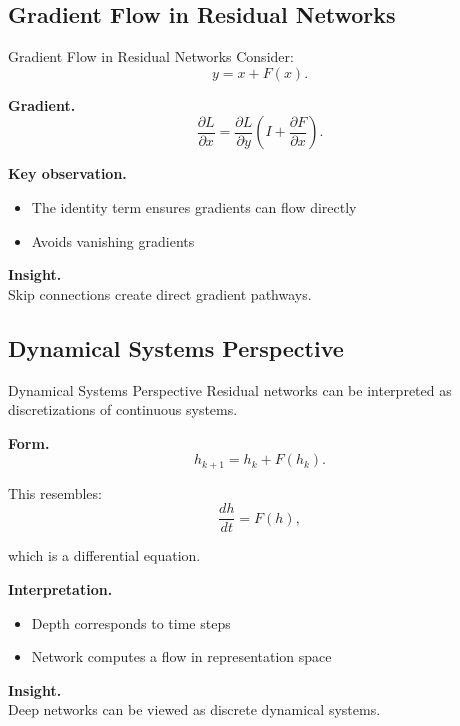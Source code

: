 \documentclass[aspectratio=169,11pt]{beamer}
\begin{document}
\subsection{Gradient Flow in Residual Networks}
\begin{frame}[t,allowframebreaks]{Gradient Flow in Residual Networks}
\small
Consider:
\[
y = x + F(x).
\]

\textbf{Gradient.}\\ \[
\frac{\partial L}{\partial x}
= \frac{\partial L}{\partial y}
\left( I + \frac{\partial F}{\partial x} \right).
\]

\textbf{Key observation.}\\ \begin{itemize}
    \item The identity term ensures gradients can flow directly
    \item Avoids vanishing gradients
\end{itemize}

\textbf{Insight.}\\ Skip connections create direct gradient pathways.
\end{frame}

\subsection{Dynamical Systems Perspective}
\begin{frame}[t,allowframebreaks]{Dynamical Systems Perspective}
\small
Residual networks can be interpreted as discretizations of continuous systems.

\textbf{Form.}\\ \[
h_{k+1} = h_k + F(h_k).
\]

This resembles:
\[
\frac{dh}{dt} = F(h),
\]

which is a differential equation.

\textbf{Interpretation.}\\ \begin{itemize}
    \item Depth corresponds to time steps
    \item Network computes a flow in representation space
\end{itemize}

\textbf{Insight.}\\ Deep networks can be viewed as discrete dynamical systems.
\end{frame}
\end{document}
